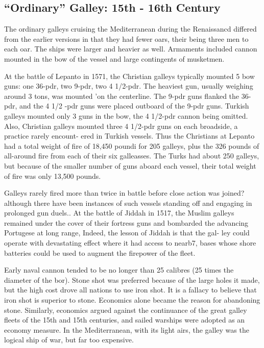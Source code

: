 \documentclass{article}
\begin{document}
\begin{multicols}{2}
\subsection{``Ordinary'' Galley:  15th - 16th Century}

The ordinary galleys cruising the Mediterranean during the Renaissancd
differed from the earlier versions in that they had fewer oars, their
being three men to each oar.  The ships were larger and heavier as
well. Armaments included cannon mounted in the bow of the vessel and
large contingents of musketmen.

At the battle of Lepanto in 1571, the Christian galleys typically
mounted 5 bow guns: one 36-pdr, two 9-pdr, two 4 1/2-pdr. The heaviest
gun, usually weighing around 3 tons, was mounted 'on the
centerline. The 9-pdr guns flanked the 36-pdr, and the 4 1/2 -pdr guns
were placed outboard of the 9-pdr guns.  Turkish galleys mounted only
3 guns in the bow, the 4 1/2-pdr cannon being omitted.  Also,
Christian galleys mounted three 4 1/2-pdr guns on each broadside, a
practice rarely encount- ered in Turkish vessels.  Thus the Christians
at Lepanto had a total weight of fire of 18,450 poundi for 205
galleys, plus the 326 pounds of all-around fire from each of their six
galleasses.  The Turks had about 250 galleys, but because of the
smaller number of guns aboard each vessel, their total weight of fire
was only 13,500 pounds.

Galleys rarely fired more than twice in battle before close action was
joined? although there have been instances of such vessels standing
off and engaging in prolonged gun duels..  At the battle of Jiddah in
1517, the Muslim galleys remained under the cover of their fortress
guns and bombarded the advancing Portugese at long range, Indeed, the
lesson of Jiddah is that the gal- ley could operate with devastating
effect where it had access to nearb7, bases whose shore batteries
could be used to augment the firepower of the fleet.

Early naval cannon tended to be no longer than 25 calibres (25 times
the diameter of the bor).  Stone shot was preferred because of the
large holes it made, but the high cost drove all nations to use iron
shot.  It is a fallacy to believe that iron shot is superior to stone.
Economics alone became the reason for abandoning stone. Similarly,
economics argued against the continuance of the great galley fleets of
the 15th and 15th centuries, and sailed warships were adopted as an
economy measure. In the Mediterranean, with its light airs, the galley
was the logical ship of war, but far too expensive.


\end{multicols}
\end{document}
